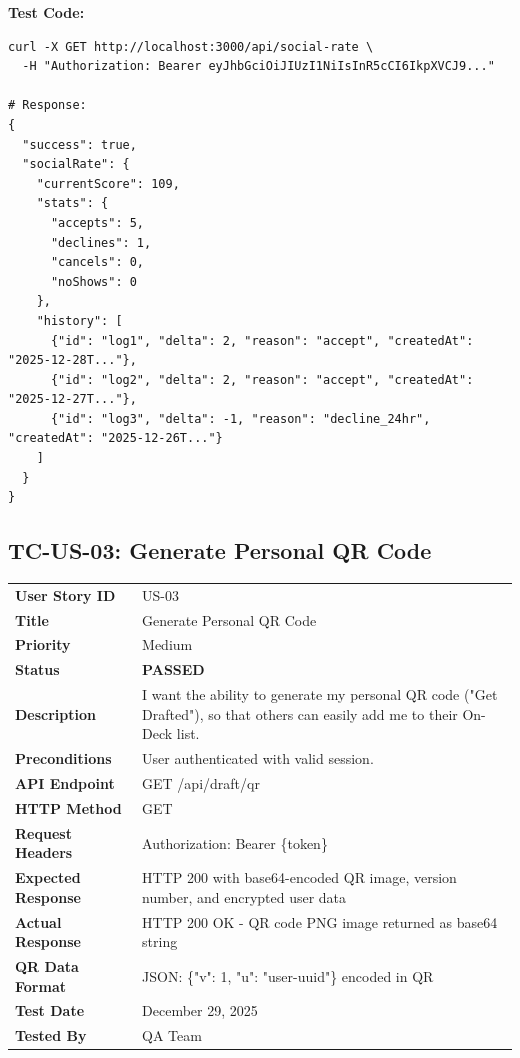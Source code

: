 \documentclass[11pt,a4paper]{article}
\newcommand{\passed}{\textcolor{pass}{\textbf{PASSED}}}
\begin{document}
\vspace{0.3cm}
\textbf{Test Code:}
\begin{lstlisting}
curl -X GET http://localhost:3000/api/social-rate \
  -H "Authorization: Bearer eyJhbGciOiJIUzI1NiIsInR5cCI6IkpXVCJ9..."

# Response:
{
  "success": true,
  "socialRate": {
    "currentScore": 109,
    "stats": {
      "accepts": 5,
      "declines": 1,
      "cancels": 0,
      "noShows": 0
    },
    "history": [
      {"id": "log1", "delta": 2, "reason": "accept", "createdAt": "2025-12-28T..."},
      {"id": "log2", "delta": 2, "reason": "accept", "createdAt": "2025-12-27T..."},
      {"id": "log3", "delta": -1, "reason": "decline_24hr", "createdAt": "2025-12-26T..."}
    ]
  }
}
\end{lstlisting}

\vspace{0.5cm}


\subsection{TC-US-03: Generate Personal QR Code}

\begin{tabularx}{\textwidth}{|p{3.2cm}|Y|}
\hline
{}
 \\
\hline
\textbf{User Story ID} & US-03 \\
\hline
\textbf{Title} & Generate Personal QR Code \\
\hline
\textbf{Priority} & Medium \\
\hline
\textbf{Status} & \passed \\
\hline
\textbf{Description} & I want the ability to generate my personal QR code ("Get Drafted"), so that others can easily add me to their On-Deck list. \\
\hline
\textbf{Preconditions} & User authenticated with valid session. \\
\hline
\textbf{API Endpoint} & GET /api/draft/qr \\
\hline
\textbf{HTTP Method} & GET \\
\hline
\textbf{Request Headers} & Authorization: Bearer \{token\} \\
\hline
\textbf{Expected Response} & HTTP 200 with base64-encoded QR image, version number, and encrypted user data \\
\hline
\textbf{Actual Response} & HTTP 200 OK - QR code PNG image returned as base64 string \\
\hline
\textbf{QR Data Format} & JSON: \{"v": 1, "u": "user-uuid"\} encoded in QR \\
\hline
\textbf{Test Date} & December 29, 2025 \\
\hline
\textbf{Tested By} & QA Team \\
\hline
\end{tabularx}
\end{document}
